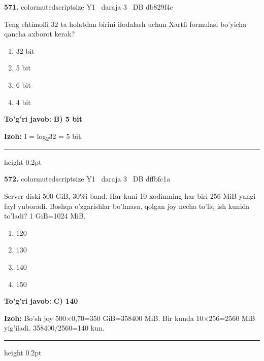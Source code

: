 \documentclass[10pt,a4paper,oneside]{article}
\begin{document}
\noindent\textbf{\color{ink}571.}  {color{muted}scriptsize Y1 \textbullet\ daraja 3 \textbullet\ DB db829f4c}
\par
Teng ehtimolli 32 ta holatdan birini ifodalash uchun Xartli formulasi bo'yicha qancha axborot kerak?
\begin{enumerate}[label=\Alph*),leftmargin=9mm]
\item 32 bit
\item 5 bit
\item 6 bit
\item 4 bit
\end{enumerate}
\begin{tcolorbox}[enhanced,breakable,colback=teal!4,colframe=teal!50!black,boxrule=0.5pt,arc=1.1mm,left=3mm,right=3mm,top=1.7mm,bottom=1.7mm,before skip=2mm,after skip=2mm]
\textbf{\color{teal}To'g'ri javob:} \textbf{B) 5 bit}
\par\smallskip
\textbf{Izoh:} I = log\textsubscript{2}32 = 5 bit.
\end{tcolorbox}
\vspace{2mm}\hrule height 0.2pt \vspace{3mm}

\noindent\textbf{\color{ink}572.}  {color{muted}scriptsize Y1 \textbullet\ daraja 3 \textbullet\ DB dffbfc1a}
\par
Server diski 500 GiB, 30\%i band. Har kuni 10 xodimning har biri 256 MiB yangi fayl yuboradi. Boshqa o'zgarishlar bo'lmasa, qolgan joy necha to'liq ish kunida to'ladi? 1 GiB=1024 MiB.
\begin{enumerate}[label=\Alph*),leftmargin=9mm]
\item 120
\item 130
\item 140
\item 150
\end{enumerate}
\begin{tcolorbox}[enhanced,breakable,colback=teal!4,colframe=teal!50!black,boxrule=0.5pt,arc=1.1mm,left=3mm,right=3mm,top=1.7mm,bottom=1.7mm,before skip=2mm,after skip=2mm]
\textbf{\color{teal}To'g'ri javob:} \textbf{C) 140}
\par\smallskip
\textbf{Izoh:} Bo'sh joy 500\ensuremath{\times}0,70=350 GiB=358400 MiB. Bir kunda 10\ensuremath{\times}256=2560 MiB yig'iladi. 358400/2560=140 kun.
\end{tcolorbox}
\vspace{2mm}\hrule height 0.2pt \vspace{3mm}
\end{document}
